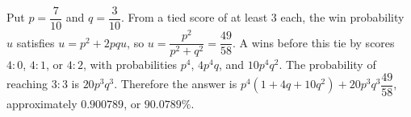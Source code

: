Put $p=\dfrac{7}{10}$ and $q=\dfrac{3}{10}$. From a tied score of at least $3$ each, the win probability $u$ satisfies $u=p^2+2pqu$, so $u=\dfrac{p^2}{p^2+q^2}=\dfrac{49}{58}$. A wins before this tie by scores $4:0$, $4:1$, or $4:2$, with probabilities $p^4$, $4p^4q$, and $10p^4q^2$. The probability of reaching $3:3$ is $20p^3q^3$. Therefore the answer is $\boxed{p^4(1+4q+10q^2)+20p^3q^3\dfrac{49}{58}}$, approximately $0.900789$, or $90.0789\%$.
